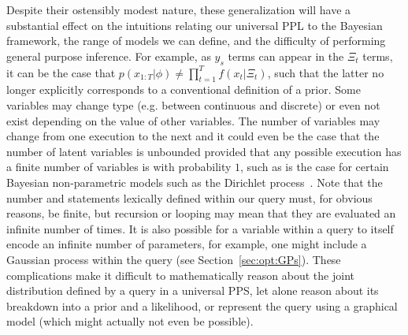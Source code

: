 Despite their ostensibly modest nature,
these generalization will have a substantial effect on the intuitions relating our universal
PPL to the Bayesian framework, the range of models we can define, and the difficulty of performing
general purpose inference.  For example, as $y_s$ terms can appear in the $\Xi_t$ terms,
it can be the case that $p(x_{1:T} | \phi) \neq \prod_{t=1}^{T} f(x_t | \Xi_t)$, such that the latter no
longer explicitly corresponds to a conventional definition of a prior.  Some variables may change type (e.g.
between continuous and discrete) or even not exist depending on the value of other variables.  The number
of variables may change from one execution to the next and it could even be the case that the number
of latent variables is unbounded provided that any possible execution has a 
finite number of variables is with probability $1$, such
as is the case for certain Bayesian non-parametric models such as the Dirichlet process~\citep{ferguson1973bayesian,teh2011dirichlet,bloemreddy2017rpm}.
Note that the number \sample and \observe statements lexically defined within our query must,
for obvious reasons, be finite, but recursion or looping may mean that they are evaluated an infinite
number of times.  It is also possible for a variable within a query to itself encode an
infinite number of parameters, for example, one might include a Gaussian process within the query (see Section~\ref{sec:opt:GPs}).
These complications make it difficult to mathematically reason about the joint distribution defined by a query in a
universal PPS, let alone reason about its breakdown into a prior and a likelihood, or represent the query
using a graphical model (which might actually not even be possible).

